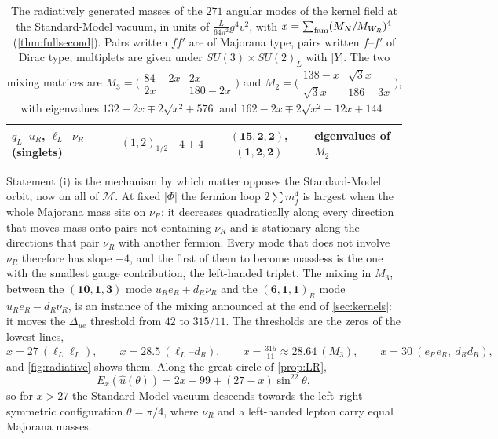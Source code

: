 \begin{table}[t]
\begin{tabular}{@{}llccl@{}}
$q_L$--$u_R$, $\ell_L$--$\nu_R$ (singlets) & $(1,2)_{1/2}$ & $4+4$ & $(\mathbf{15},\mathbf2,\mathbf2)$, $(\mathbf1,\mathbf2,\mathbf2)$ & eigenvalues of $M_2$\\
\bottomrule
\end{tabular}
\caption{The radiatively generated masses of the $271$ angular modes of the kernel field at the Standard-Model vacuum, in units of $\tfrac L{64\pi^2}g^4v^2$, with
$x=\sum_{\rm fam}(M_N/M_{W_R})^4$ (\cref{thm:fullsecond}). Pairs written $ff'$ are of Majorana type, pairs written $f$--$f'$ of Dirac type; multiplets are given
under $SU(3)\times SU(2)_L$ with $|Y|$. The two mixing matrices are
$M_3=\bigl(\begin{smallmatrix}84-2x&2x\\2x&180-2x\end{smallmatrix}\bigr)$ and $M_2=\bigl(\begin{smallmatrix}138-x&\sqrt3x\\\sqrt3x&186-3x\end{smallmatrix}\bigr)$, with eigenvalues
$132-2x\mp2\sqrt{x^2+576}$ and $162-2x\mp2\sqrt{x^2-12x+144}$.}
\label{tab:271}
\end{table}

Statement (i) is the mechanism by which matter opposes the Standard-Model orbit, now on all of $\mathcal M$. At fixed $|\Phi|$ the fermion loop $2\sum m_f^4$ is largest when the
whole Majorana mass sits on $\nu_R$; it decreases quadratically along every direction that moves mass onto pairs not containing $\nu_R$ and is stationary along the
directions that pair $\nu_R$ with another fermion. Every mode that does not involve $\nu_R$ therefore has slope $-4$, and the first of them to become massless is the one
with the smallest gauge contribution, the left-handed triplet. The mixing in $M_3$, between the $(\mathbf{10},\mathbf1,\mathbf3)$ mode $u_Re_R+d_R\nu_R$ and the $(\mathbf6,\mathbf1,\mathbf1)_R$
mode $u_Re_R-d_R\nu_R$, is an instance of the mixing announced at the end of \cref{sec:kernels}: it moves the $\Delta_{ue}$ threshold from $42$ to $315/11$. The
thresholds are the zeros of the lowest lines,
\[
x=27\ (\ell_L\ell_L),\qquad x=28.5\ (\ell_L\text{--}d_R),\qquad x=\tfrac{315}{11}\approx28.64\ (M_3),\qquad x=30\ (e_Re_R,\ d_Rd_R),
\]
and \cref{fig:radiative} shows them. Along the great circle of \cref{prop:LR},
\[
E_x(\hat u(\theta))=2x-99+(27-x)\sin^22\theta ,
\]
so for $x>27$ the Standard-Model vacuum descends towards the left--right symmetric configuration $\theta=\pi/4$, where $\nu_R$ and a left-handed lepton carry equal
Majorana masses.


